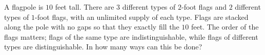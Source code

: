 A flagpole is $10$ feet tall. There are $3$ different types of $2$-foot flags and $2$ different types of $1$-foot flags, with an unlimited supply of each type. Flags are stacked along the pole with no gaps so that they exactly fill the $10$ feet. The order of the flags matters; flags of the same type are indistinguishable, while flags of different types are distinguishable. In how many ways can this be done?

